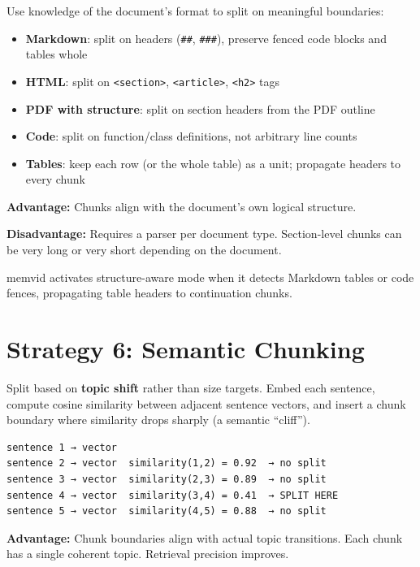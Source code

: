 Use knowledge of the document's format to split on meaningful boundaries:

\begin{itemize}
    \item \textbf{Markdown}: split on headers (\texttt{\#\#}, \texttt{\#\#\#}), preserve
          fenced code blocks and tables whole
    \item \textbf{HTML}: split on \texttt{<section>}, \texttt{<article>}, \texttt{<h2>} tags
    \item \textbf{PDF with structure}: split on section headers from the PDF outline
    \item \textbf{Code}: split on function/class definitions, not arbitrary line counts
    \item \textbf{Tables}: keep each row (or the whole table) as a unit; propagate headers
          to every chunk
\end{itemize}

\textbf{Advantage:} Chunks align with the document's own logical structure.

\textbf{Disadvantage:} Requires a parser per document type. Section-level chunks can be very
long or very short depending on the document.

memvid activates structure-aware mode when it detects Markdown tables or code fences,
propagating table headers to continuation chunks.

\section{Strategy 6: Semantic Chunking}

Split based on \textbf{topic shift} rather than size targets. Embed each sentence, compute
cosine similarity between adjacent sentence vectors, and insert a chunk boundary where
similarity drops sharply (a semantic ``cliff'').

\begin{Verbatim}
sentence 1 → vector
sentence 2 → vector  similarity(1,2) = 0.92  → no split
sentence 3 → vector  similarity(2,3) = 0.89  → no split
sentence 4 → vector  similarity(3,4) = 0.41  → SPLIT HERE
sentence 5 → vector  similarity(4,5) = 0.88  → no split
\end{Verbatim}

\textbf{Advantage:} Chunk boundaries align with actual topic transitions. Each chunk has a
single coherent topic. Retrieval precision improves.

